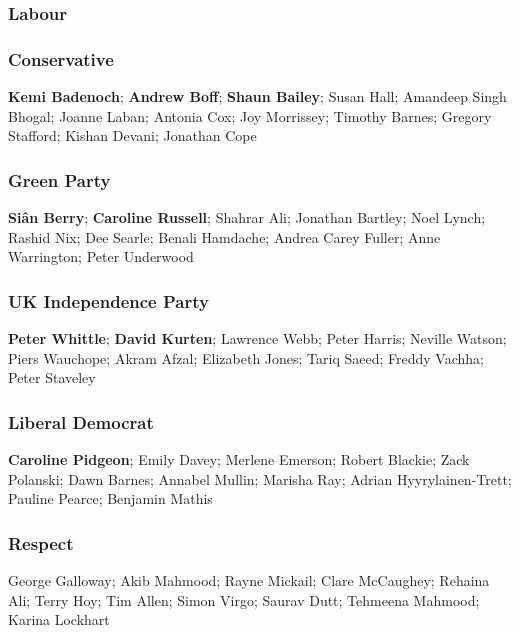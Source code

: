 \begin{resultsiii}

\subsubsection*{Labour}

\subsubsection*{Conservative}
\textbf{Kemi Badenoch}; \textbf{Andrew Boff}; \textbf{Shaun Bailey}; Susan Hall; Amandeep Singh Bhogal; Joanne Laban; Antonia Cox; Joy Morrissey; Timothy Barnes; Gregory Stafford; Kishan Devani; Jonathan Cope

\subsubsection*{Green Party}
\textbf{Siân Berry}; \textbf{Caroline Russell}; Shahrar Ali; Jonathan Bartley; Noel Lynch; Rashid Nix; Dee Searle; Benali Hamdache; Andrea Carey Fuller; Anne Warrington; Peter Underwood

\subsubsection*{UK Independence Party}
\textbf{Peter Whittle}; \textbf{David Kurten}; Lawrence Webb; Peter Harris; Neville Watson; Piers Wauchope; Akram Afzal; Elizabeth Jones; Tariq Saeed; Freddy Vachha; Peter Staveley

\subsubsection*{Liberal Democrat}
\textbf{Caroline Pidgeon}; Emily Davey; Merlene Emerson; Robert Blackie; Zack Polanski; Dawn Barnes; Annabel Mullin; Marisha Ray; Adrian Hyyrylainen-Trett; Pauline Pearce; Benjamin Mathis

\subsubsection*{Respect}
George Galloway; Akib Mahmood; Rayne Mickail; Clare McCaughey; Rehaina Ali; Terry Hoy; Tim Allen; Simon Virgo; Saurav Dutt; Tehmeena Mahmood; Karina Lockhart


\end{resultsiii}
